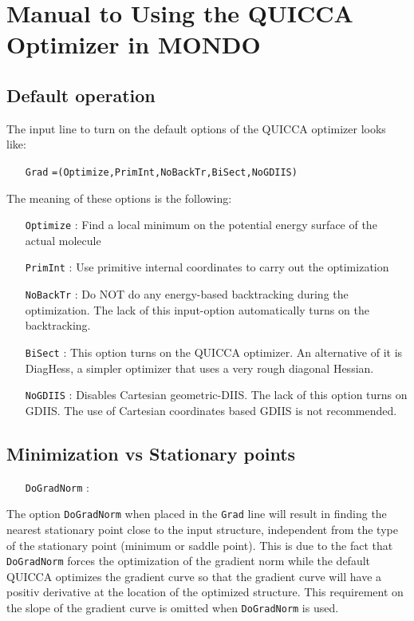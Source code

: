\documentclass[prl,aps,preprint,superbib,12pt]{revtex4}
\begin{document}

\section{Manual to Using the QUICCA Optimizer in MONDO}

\subsection{Default operation}
The input line to turn on the default options of the QUICCA optimizer
looks like:
\begin{itemize}
\item[{\tt Grad}]{\tt =(Optimize,PrimInt,NoBackTr,BiSect,NoGDIIS) }
\end{itemize}

\noindent
The meaning of these options is the following:
\begin{itemize}
\item[{\tt Optimize}] : Find a local minimum on the potential energy surface of the actual molecule
\item[{\tt PrimInt}] : Use primitive internal coordinates to carry out the optimization
\item[{\tt NoBackTr}] : Do NOT do any energy-based backtracking during
the optimization. The lack of this input-option automatically
turns on the backtracking.
\item[{\tt BiSect}] : This option turns on the QUICCA optimizer. An alternative of it is DiagHess, a simpler optimizer that uses a very rough 
diagonal Hessian.
\item[{\tt NoGDIIS}] : Disables Cartesian geometric-DIIS. The lack of this 
option turns on GDIIS. The use of Cartesian coordinates based 
GDIIS is not recommended.
\end{itemize}

\subsection{Minimization vs Stationary points}
\begin{itemize}
\item[{\tt DoGradNorm}] :
\end{itemize}
The option {\tt DoGradNorm} when placed in the {\tt Grad} line
will result in finding the nearest stationary point close to the
input structure, independent from the type of the stationary point
(minimum or saddle point). This is due to the fact that
{\tt DoGradNorm} forces the optimization of the gradient norm
while the default QUICCA optimizes the gradient curve so that 
the gradient curve will have a positiv derivative at the location of the
optimized structure. This requirement on the slope of the gradient
curve is omitted when {\tt DoGradNorm} is used.
 
\end{document}
